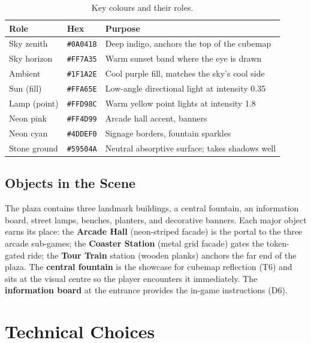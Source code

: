 \documentclass[10pt,a4paper]{article}
\begin{document}
\begin{table}[H]
  \centering
  \caption{Key colours and their roles.}
  \label{tab:palette}
  \begin{tabularx}{\textwidth}{@{}llX@{}}
    \toprule
    \textbf{Role} & \textbf{Hex} & \textbf{Purpose} \\
    \midrule
    Sky zenith     & \texttt{\#0A0418} & Deep indigo, anchors the top of the cubemap \\
    Sky horizon    & \texttt{\#FF7A35} & Warm sunset band where the eye is drawn \\
    Ambient        & \texttt{\#1F1A2E} & Cool purple fill, matches the sky's cool side \\
    Sun (fill)     & \texttt{\#FFA65E} & Low-angle directional light at intensity 0.35 \\
    Lamp (point)   & \texttt{\#FFD98C} & Warm yellow point lights at intensity 1.8 \\
    Neon pink      & \texttt{\#FF4D99} & Arcade hall accent, banners \\
    Neon cyan      & \texttt{\#4DDEF0} & Signage borders, fountain sparkles \\
    Stone ground   & \texttt{\#59504A} & Neutral absorptive surface; takes shadows well \\
    \bottomrule
  \end{tabularx}
\end{table}

\subsection{Objects in the Scene}

The plaza contains three landmark buildings, a central fountain, an information board,
street lamps, benches, planters, and decorative banners. Each major object earns its place:
the \textbf{Arcade Hall} (neon-striped facade) is the portal to the three arcade
sub-games; the \textbf{Coaster Station} (metal grid facade) gates the token-gated ride;
the \textbf{Tour Train} station (wooden planks) anchors the far end of the plaza. The
\textbf{central fountain} is the showcase for cubemap reflection (T6) and sits at the
visual centre so the player encounters it immediately. The \textbf{information board} at
the entrance provides the in-game instructions (D6).

\section{Technical Choices}
\end{document}
